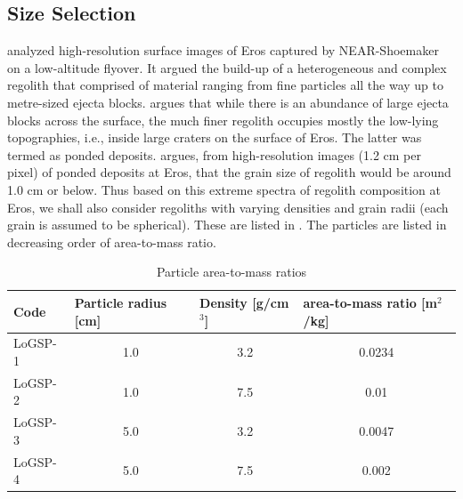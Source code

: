 \subsection{Size Selection}
\label{subsec:regolith_size_selection}
\cite{Veverka2001} analyzed high-resolution surface images of Eros captured by \gls{NEAR}-Shoemaker on a low-altitude flyover. It argued the build-up of a heterogeneous and complex regolith that comprised of material ranging from fine particles all the way up to metre-sized ejecta blocks. \cite{Veverka2001} argues that while there is an abundance of large ejecta blocks across the surface, the much finer regolith occupies mostly the low-lying topographies, i.e., inside large craters on the surface of Eros. The latter was termed as ponded deposits. \cite{Robinson2001} argues, from high-resolution images (1.2 cm per pixel) of ponded deposits at Eros, that the grain size of regolith would be around 1.0 cm or below.
%
\newline\newline
%
Thus based on this extreme spectra of regolith composition at Eros, we shall also consider regoliths with varying densities and grain radii (each grain is assumed to be spherical). These are listed in . The particles are listed in decreasing order of area-to-mass ratio.
\begin{table}[htb]
\centering
\captionsetup{justification=centering}
\caption{Particle area-to-mass ratios}
\label{tab:area_to_mass_ratio}
\begin{tabular}{|l|c|c|c|}
\hline
Code    & \multicolumn{1}{l|}{Particle radius {[}cm{]}} & \multicolumn{1}{l|}{Density {[}g/cm$^3${]}} & \multicolumn{1}{l|}{area-to-mass ratio {[}m$^2$/kg{]}} \\ \hline
LoGSP-1     &   1.0     &   3.2     & 0.0234        \\ \hline
LoGSP-2     &   1.0     &   7.5     & 0.01          \\ \hline
LoGSP-3     &   5.0     &   3.2     & 0.0047        \\ \hline
LoGSP-4     &   5.0     &   7.5     & 0.002         \\ \hline
\end{tabular}
\end{table}
\FloatBarrier

